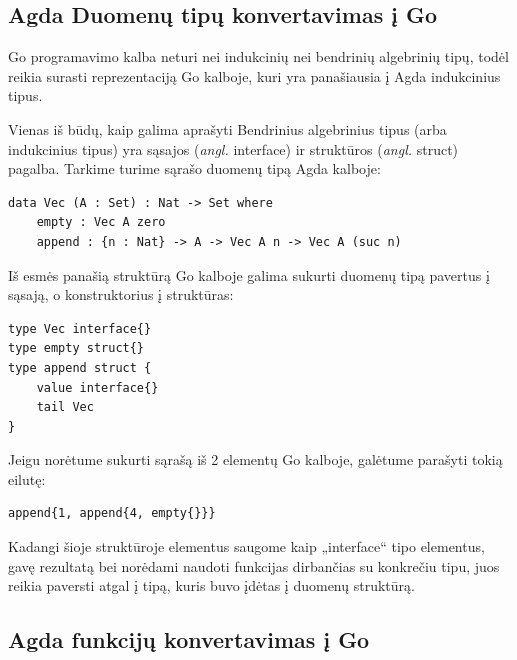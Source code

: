 \documentclass{VUMIFPSkursinis}
\begin{document}
\subsection{Agda Duomenų tipų konvertavimas į Go}
Go programavimo kalba neturi nei indukcinių nei bendrinių algebrinių tipų, todėl reikia surasti reprezentaciją Go kalboje, kuri yra panašiausia į Agda indukcinius tipus.\par Vienas iš būdų, kaip galima aprašyti Bendrinius algebrinius tipus (arba indukcinius tipus) yra sąsajos (\textit{angl.} interface) ir struktūros (\textit{angl.} struct) pagalba. Tarkime turime sąrašo duomenų tipą Agda kalboje:
\begin{lstlisting}
data Vec (A : Set) : Nat -> Set where
	empty : Vec A zero
	append : {n : Nat} -> A -> Vec A n -> Vec A (suc n)
\end{lstlisting}
Iš esmės panašią struktūrą Go kalboje galima sukurti duomenų tipą pavertus į sąsają, o konstruktorius į struktūras:
\begin{lstlisting}[language=GoCust]
type Vec interface{}
type empty struct{}
type append struct {
	value interface{}
	tail Vec
}
\end{lstlisting}
Jeigu norėtume sukurti sąrašą iš 2 elementų Go kalboje, galėtume parašyti tokią eilutę: 
\begin{lstlisting}[language=GoCust]
append{1, append{4, empty{}}}
	\end{lstlisting}
Kadangi šioje struktūroje elementus saugome kaip „interface{}“ tipo elementus, gavę rezultatą bei norėdami naudoti funkcijas dirbančias su konkrečiu tipu, juos reikia paversti atgal į tipą, kuris buvo įdėtas į duomenų struktūrą.
\subsection{Agda funkcijų konvertavimas į Go}
\end{document}
